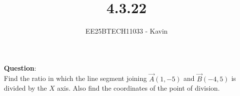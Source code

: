 \documentclass[journal]{IEEEtran}
\begin{document}

\vspace{3cm}

\title{4.3.22}
\author{EE25BTECH11033 - Kavin}
{\let\newpage\relax\maketitle}

\renewcommand{\thefigure}{\theenumi}
\renewcommand{\thetable}{\theenumi}
\setlength{\intextsep}{10pt} %
\textbf{Question}:\\
Find the ratio in which the line segment joining $\vec{A}(1,-5)$  and  $\vec{B}(-4,5)$ is divided by the $X$ axis. Also find the coordinates of the point of division.\\
\bigskip
\end{document}
